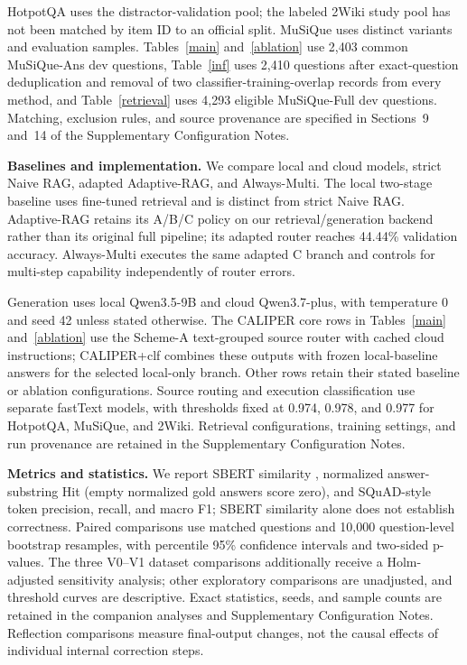 \documentclass[a4paper,fleqn]{cas-dc}
\begin{document}
HotpotQA uses the distractor-validation pool; the labeled 2Wiki study pool has not been matched by item ID to an official split. MuSiQue uses distinct variants and evaluation samples. Tables~\ref{main} and~\ref{ablation} use 2,403 common MuSiQue-Ans dev questions, Table~\ref{inf} uses 2,410 questions after exact-question deduplication and removal of two classifier-training-overlap records from every method, and Table~\ref{retrieval} uses 4,293 eligible MuSiQue-Full dev questions. Matching, exclusion rules, and source provenance are specified in Sections~9 and~14 of the Supplementary Configuration Notes.





\textbf{Baselines and implementation.} We compare local and cloud models, strict Naive RAG, adapted Adaptive-RAG, and Always-Multi. The local two-stage baseline uses fine-tuned retrieval and is distinct from strict Naive RAG. Adaptive-RAG retains its A/B/C policy on our retrieval/generation backend rather than its original full pipeline; its adapted router reaches 44.44\% validation accuracy. Always-Multi executes the same adapted C branch and controls for multi-step capability independently of router errors.

Generation uses local Qwen3.5-9B and cloud Qwen3.7-plus, with temperature 0 and seed 42 unless stated otherwise. The CALIPER core rows in Tables~\ref{main} and~\ref{ablation} use the Scheme-A text-grouped source router with cached cloud instructions; CALIPER+clf combines these outputs with frozen local-baseline answers for the selected local-only branch. Other rows retain their stated baseline or ablation configurations. Source routing and execution classification use separate fastText models, with thresholds fixed at 0.974, 0.978, and 0.977 for HotpotQA, MuSiQue, and 2Wiki. Retrieval configurations, training settings, and run provenance are retained in the Supplementary Configuration Notes.

\textbf{Metrics and statistics.} We report SBERT similarity \cite{reimers2019sentence}, normalized answer-substring Hit (empty normalized gold answers score zero), and SQuAD-style token precision, recall, and macro F1; SBERT similarity alone does not establish correctness. Paired comparisons use matched questions and 10,000 question-level bootstrap resamples, with percentile 95\% confidence intervals and two-sided p-values. The three V0--V1 dataset comparisons additionally receive a Holm-adjusted sensitivity analysis; other exploratory comparisons are unadjusted, and threshold curves are descriptive. Exact statistics, seeds, and sample counts are retained in the companion analyses and Supplementary Configuration Notes. Reflection comparisons measure final-output changes, not the causal effects of individual internal correction steps.
\end{document}
